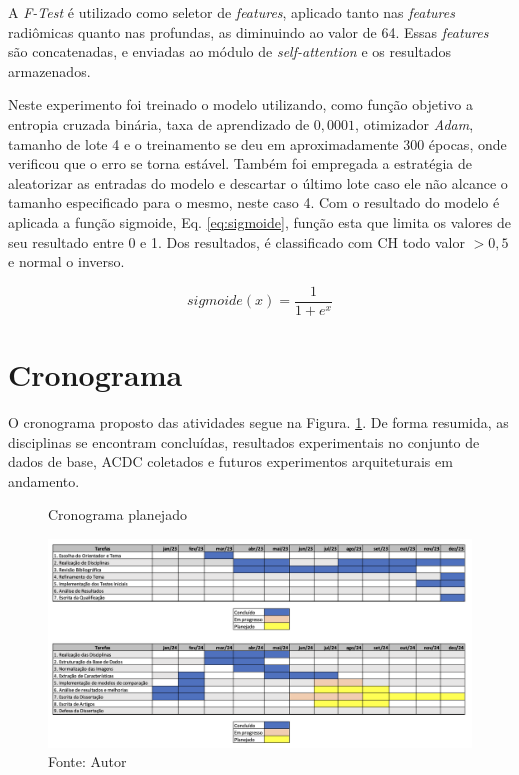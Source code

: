 A \textit{F-Test} é utilizado como seletor de \textit{features}, aplicado tanto nas \textit{features} radiômicas quanto nas profundas, as diminuindo ao valor de 64. Essas \textit{features} são concatenadas, e enviadas ao módulo de \textit{self-attention} e os resultados armazenados.

Neste experimento foi treinado o modelo utilizando, como função objetivo a entropia cruzada binária, taxa de aprendizado de $0,0001$, otimizador \textit{Adam}, tamanho de lote 4 e o treinamento se deu em aproximadamente 300 épocas, onde verificou que o erro se torna estável. Também foi empregada a estratégia de aleatorizar as entradas do modelo e descartar o último lote caso ele não alcance o tamanho especificado para o mesmo, neste caso 4. Com o resultado do modelo é aplicada a função sigmoide, Eq. \ref{eq:sigmoide}, função esta que limita os valores de seu resultado entre 0 e 1. Dos resultados, é classificado com CH todo valor $>0,5$ e normal o inverso.

\begin{equation}
\textit{sigmoide}(x) = \frac{1}{1 + e^x}
\label{eq:sigmoide}
\end{equation}

\section{Cronograma}
\label{sec:cronograma}

O cronograma proposto das atividades segue na Figura. \ref{fig:fig014}. De forma resumida, as disciplinas se encontram concluídas, resultados experimentais no conjunto de dados de base, \gls{ACDC} coletados e futuros experimentos arquiteturais em andamento.

\begin{figure}[htbp]
    \centering
    \caption{Cronograma planejado}
    \includegraphics[width=1\textwidth]{figures/fig014.png}
    \caption*{Fonte: Autor}
    \label{fig:fig014}
\end{figure}
